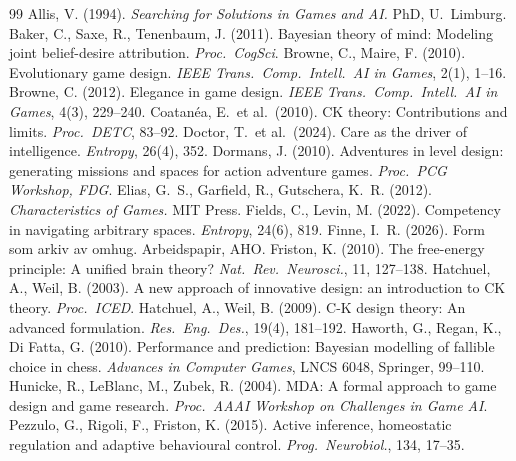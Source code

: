 \documentclass[10pt,twocolumn]{article}
\begin{document}
\begin{thebibliography}{99}\small
{} Allis, V. (1994). \textit{Searching for Solutions in Games and AI.} PhD, U.\ Limburg.
 Baker, C., Saxe, R., Tenenbaum, J. (2011). Bayesian theory of mind: Modeling joint belief-desire attribution. \textit{Proc.\ CogSci}.
 Browne, C., Maire, F. (2010). Evolutionary game design. \textit{IEEE Trans.\ Comp.\ Intell.\ AI in Games}, 2(1), 1--16.
 Browne, C. (2012). Elegance in game design. \textit{IEEE Trans.\ Comp.\ Intell.\ AI in Games}, 4(3), 229--240.
 Coatan\'ea, E.\ et al.\ (2010). CK theory: Contributions and limits. \textit{Proc.\ DETC}, 83--92.
 Doctor, T.\ et al.\ (2024). Care as the driver of intelligence. \textit{Entropy}, 26(4), 352.
 Dormans, J. (2010). Adventures in level design: generating missions and spaces for action adventure games. \textit{Proc.\ PCG Workshop, FDG}.
 Elias, G.\ S., Garfield, R., Gutschera, K.\ R. (2012). \textit{Characteristics of Games.} MIT Press.
 Fields, C., Levin, M. (2022). Competency in navigating arbitrary spaces. \textit{Entropy}, 24(6), 819.
 Finne, I.\ R. (2026). Form som arkiv av omhug. Arbeidspapir, AHO.
 Friston, K. (2010). The free-energy principle: A unified brain theory? \textit{Nat.\ Rev.\ Neurosci.}, 11, 127--138.
 Hatchuel, A., Weil, B. (2003). A new approach of innovative design: an introduction to CK theory. \textit{Proc.\ ICED}.
 Hatchuel, A., Weil, B. (2009). C-K design theory: An advanced formulation. \textit{Res.\ Eng.\ Des.}, 19(4), 181--192.
 Haworth, G., Regan, K., Di Fatta, G. (2010). Performance and prediction: Bayesian modelling of fallible choice in chess. \textit{Advances in Computer Games}, LNCS 6048, Springer, 99--110.
 Hunicke, R., LeBlanc, M., Zubek, R. (2004). MDA: A formal approach to game design and game research. \textit{Proc.\ AAAI Workshop on Challenges in Game AI}.
 Pezzulo, G., Rigoli, F., Friston, K. (2015). Active inference, homeostatic regulation and adaptive behavioural control. \textit{Prog.\ Neurobiol.}, 134, 17--35.

\end{thebibliography}
\end{document}
